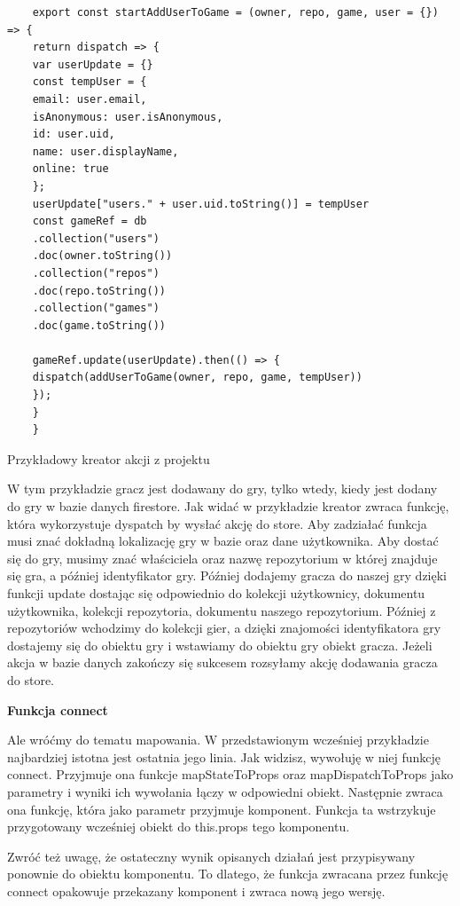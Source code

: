 \begin{listing}
	\begin{verbatim}
	export const startAddUserToGame = (owner, repo, game, user = {}) => {
	return dispatch => {
	var userUpdate = {}
	const tempUser = {
	email: user.email,
	isAnonymous: user.isAnonymous,
	id: user.uid,
	name: user.displayName,
	online: true
	};
	userUpdate["users." + user.uid.toString()] = tempUser
	const gameRef = db
	.collection("users")
	.doc(owner.toString())
	.collection("repos")
	.doc(repo.toString())
	.collection("games")
	.doc(game.toString())
	
	gameRef.update(userUpdate).then(() => {
	dispatch(addUserToGame(owner, repo, game, tempUser))
	});
	}
	}
	\end{verbatim}
	\caption{Przykładowy kreator akcji z projektu} \label{listing:firebase_action}
\end{listing}

W tym przykładzie gracz jest dodawany do gry, tylko wtedy, kiedy jest dodany do gry w bazie danych firestore. Jak widać w przykładzie kreator zwraca funkcję, która wykorzystuje dyspatch by wysłać akcję do store. Aby zadziałać funkcja musi znać dokładną lokalizację gry w bazie oraz dane użytkownika. Aby dostać się do gry, musimy znać właściciela oraz nazwę repozytorium w której znajduje się gra, a później identyfikator gry. Później dodajemy gracza do naszej gry dzięki funkcji update dostając się odpowiednio do kolekcji użytkownicy, dokumentu użytkownika, kolekcji repozytoria, dokumentu naszego repozytorium. Później z repozytoriów wchodzimy do kolekcji gier, a dzięki znajomości identyfikatora gry dostajemy się do obiektu gry i wstawiamy do obiektu gry obiekt gracza. Jeżeli akcja w bazie danych zakończy się sukcesem rozsyłamy akcję dodawania gracza do store.
\begin{center}
	\textbf{Funkcja connect}
\end{center}
Ale wróćmy do tematu mapowania. W przedstawionym wcześniej przykładzie najbardziej istotna jest ostatnia jego linia. Jak widzisz, wywołuję w niej funkcję connect. Przyjmuje ona funkcje mapStateToProps oraz mapDispatchToProps jako parametry i wyniki ich wywołania łączy w odpowiedni obiekt. Następnie zwraca ona funkcję, która jako parametr przyjmuje komponent. Funkcja ta wstrzykuje przygotowany wcześniej obiekt do this.props tego komponentu.

Zwróć też uwagę, że ostateczny wynik opisanych działań jest przypisywany ponownie do obiektu komponentu. To dlatego, że funkcja zwracana przez funkcję connect opakowuje przekazany komponent i zwraca nową jego wersję.

